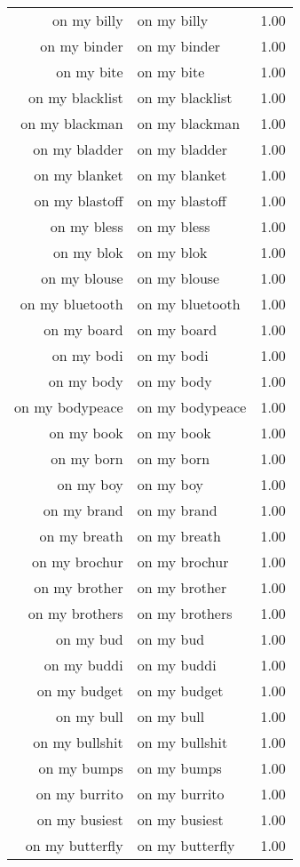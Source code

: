 \begin{table}[ht]
\begin{tabular}{rlr}
  on my billy & on my billy & 1.00 \\ 
  on my binder & on my binder & 1.00 \\ 
  on my bite & on my bite & 1.00 \\ 
  on my blacklist & on my blacklist & 1.00 \\ 
  on my blackman & on my blackman & 1.00 \\ 
  on my bladder & on my bladder & 1.00 \\ 
  on my blanket & on my blanket & 1.00 \\ 
  on my blastoff & on my blastoff & 1.00 \\ 
  on my bless & on my bless & 1.00 \\ 
  on my blok & on my blok & 1.00 \\ 
  on my blouse & on my blouse & 1.00 \\ 
  on my bluetooth & on my bluetooth & 1.00 \\ 
  on my board & on my board & 1.00 \\ 
  on my bodi & on my bodi & 1.00 \\ 
  on my body & on my body & 1.00 \\ 
  on my bodypeace & on my bodypeace & 1.00 \\ 
  on my book & on my book & 1.00 \\ 
  on my born & on my born & 1.00 \\ 
  on my boy & on my boy & 1.00 \\ 
  on my brand & on my brand & 1.00 \\ 
  on my breath & on my breath & 1.00 \\ 
  on my brochur & on my brochur & 1.00 \\ 
  on my brother & on my brother & 1.00 \\ 
  on my brothers & on my brothers & 1.00 \\ 
  on my bud & on my bud & 1.00 \\ 
  on my buddi & on my buddi & 1.00 \\ 
  on my budget & on my budget & 1.00 \\ 
  on my bull & on my bull & 1.00 \\ 
  on my bullshit & on my bullshit & 1.00 \\ 
  on my bumps & on my bumps & 1.00 \\ 
  on my burrito & on my burrito & 1.00 \\ 
  on my busiest & on my busiest & 1.00 \\ 
  on my butterfly & on my butterfly & 1.00 \\ 

\end{tabular}
\end{table}
